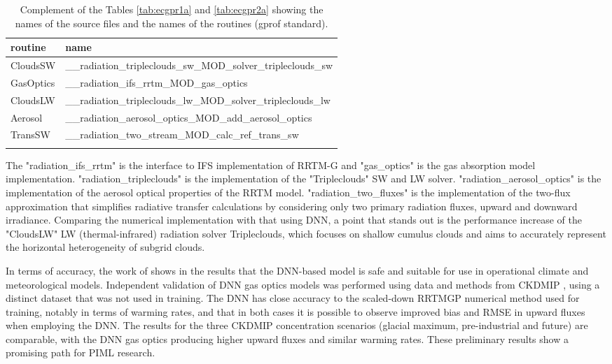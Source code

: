 \begin{table}[htb]\centering\begin{tabular}{ l l }
\hline
routine	    &  name \\
\hline
CloudsSW 	&  \_\_radiation\_tripleclouds\_sw\_MOD\_solver\_tripleclouds\_sw \\
GasOptics	&  \_\_radiation\_ifs\_rrtm\_MOD\_gas\_optics \\
CloudsLW	&  \_\_radiation\_tripleclouds\_lw\_MOD\_solver\_tripleclouds\_lw \\
Aerosol	    &  \_\_radiation\_aerosol\_optics\_MOD\_add\_aerosol\_optics \\
TransSW	    &  \_\_radiation\_two\_stream\_MOD\_calc\_ref\_trans\_sw \\
\hline \\
\end{tabular}
\caption{Complement of the Tables \ref{tab:ecgpr1a} and \ref{tab:ecgpr2a} showing the names of the source files and the names of the routines (gprof standard).}
\label{tab:ecgpr1b}
\end{table}

The "radiation\_ifs\_rrtm" is the interface to IFS implementation of RRTM-G and "gas\_optics" is the gas absorption model implementation. "radiation\_tripleclouds" is the implementation of the "Tripleclouds" SW and LW solver. "radiation\_aerosol\_optics" is the implementation of the aerosol optical properties of the RRTM model. "radiation\_two\_fluxes" is the implementation of the two-flux approximation that simplifies radiative transfer calculations by considering only two primary radiation fluxes, upward and downward irradiance. Comparing the numerical implementation with that using DNN, a point that stands out is the performance increase of the "CloudsLW" LW (thermal-infrared) radiation solver Tripleclouds, which focuses on shallow cumulus clouds and aims to accurately represent the horizontal heterogeneity of subgrid clouds.

In terms of accuracy, the work of  shows in the results that the DNN-based model is safe and suitable for use in operational climate and meteorological models. Independent validation of DNN gas optics models was performed using data and methods from CKDMIP \cite{Hogan2020}, using a distinct dataset that was not used in training. The DNN has close accuracy to the scaled-down RRTMGP numerical method used for training, notably in terms of warming rates, and that in both cases it is possible to observe improved bias and RMSE in upward fluxes when employing the DNN. The results for the three CKDMIP concentration scenarios (glacial maximum, pre-industrial and future) are comparable, with the DNN gas optics producing higher upward fluxes and similar warming rates. These preliminary results show a promising path for PIML research.


